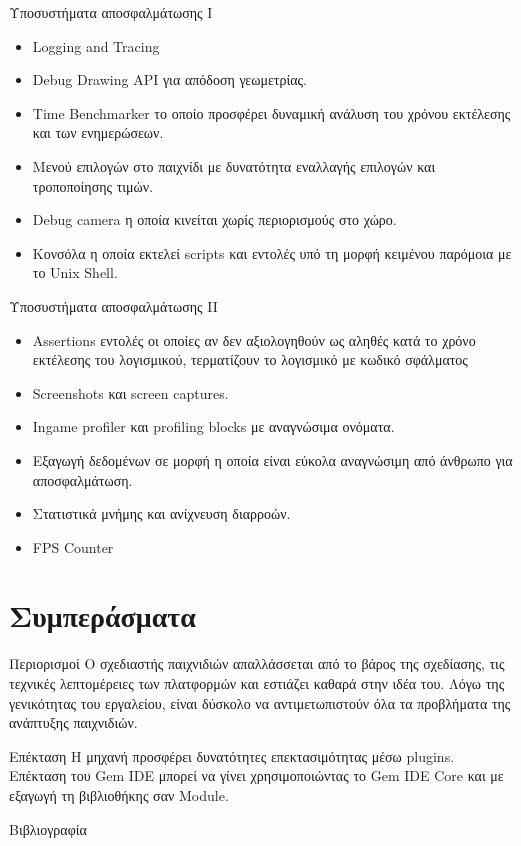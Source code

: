 \documentclass{beamer}
\begin{document}
	\begin{frame}{Υποσυστήματα αποσφαλμάτωσης Ι}
		\begin{itemize}
			\item Logging and Tracing
			\item Debug Drawing API για απόδοση γεωμετρίας.
			\item Time Benchmarker το οποίο προσφέρει δυναμική ανάλυση του χρόνου εκτέλεσης και των ενημερώσεων.
			\item Μενού επιλογών στο παιχνίδι με δυνατότητα εναλλαγής επιλογών και τροποποίησης τιμών.
			\item Debug camera η οποία κινείται χωρίς περιορισμούς στο χώρο.
			\item Κονσόλα η οποία εκτελεί scripts και εντολές υπό τη μορφή κειμένου παρόμοια με το Unix Shell.	
		\end{itemize}
	\end{frame}			
	
	\begin{frame}{Υποσυστήματα αποσφαλμάτωσης II}
		\begin{itemize}	
			\item Assertions εντολές οι οποίες αν δεν αξιολογηθούν ως αληθές κατά το χρόνο εκτέλεσης του λογισμικού, τερματίζουν το λογισμικό με κωδικό σφάλματος						
			\item Screenshots και screen captures.
			\item Ιngame profiler και profiling blocks με αναγνώσιμα ονόματα.
			\item Εξαγωγή δεδομένων σε μορφή η οποία είναι εύκολα αναγνώσιμη από άνθρωπο για αποσφαλμάτωση.
			\item Στατιστικά μνήμης και ανίχνευση διαρροών.
			\item FPS Counter
		\end{itemize}
	\end{frame}
	
	\section{Συμπεράσματα}
	\begin{frame}{Περιορισμοί}
		O σχεδιαστής παιχνιδιών απαλλάσσεται από το βάρος της σχεδίασης, τις τεχνικές λεπτομέρειες των πλατφορμών και εστιάζει καθαρά στην ιδέα του.
		\newline
		\newline
		Λόγω της γενικότητας του εργαλείου, είναι δύσκολο να αντιμετωπιστούν όλα τα προβλήματα της ανάπτυξης παιχνιδιών.
	\end{frame}		
	\begin{frame}{Επέκταση}
		Η μηχανή προσφέρει δυνατότητες επεκτασιμότητας μέσω plugins. 
		\newline
		\newline
		Επέκταση του \alert{Gem IDE} μπορεί να γίνει χρησιμοποιώντας το \alert{Gem IDE Core} και με εξαγωγή τη βιβλιοθήκης σαν \alert{Module}.
	\end{frame}		
	
	
	\begin{frame}[allowframebreaks]{Βιβλιογραφία}
		\printbibliography[heading=none]
	\end{frame}
	
\end{document}
